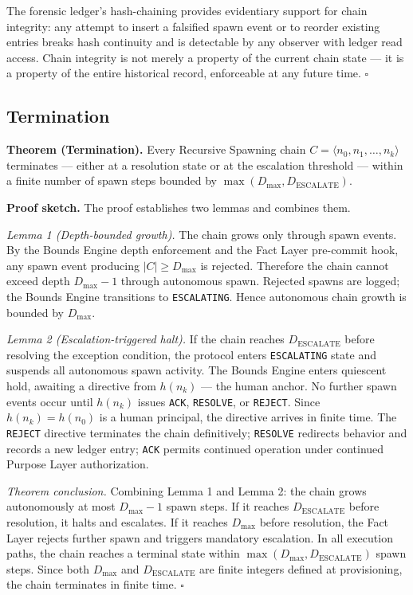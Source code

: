 The forensic ledger's hash-chaining provides evidentiary support for chain integrity: any attempt to insert a falsified spawn event or to reorder existing entries breaks hash continuity and is detectable by any observer with ledger read access. Chain integrity is not merely a property of the current chain state --- it is a property of the entire historical record, enforceable at any future time. $\square$

\subsection{Termination}
\label{sec:rs-termination}

\medskip
\noindent\textbf{Theorem (Termination).} Every Recursive Spawning chain $C = \langle n_0, n_1, \ldots, n_k \rangle$ terminates --- either at a resolution state or at the escalation threshold --- within a finite number of spawn steps bounded by $\max(D_{\mathrm{max}}, D_{\mathrm{ESCALATE}})$.

\medskip
\noindent\textbf{Proof sketch.} The proof establishes two lemmas and combines them.

\medskip
\textit{Lemma 1 (Depth-bounded growth).} The chain grows only through spawn events. By the Bounds Engine depth enforcement and the Fact Layer pre-commit hook, any spawn event producing $|C| \geq D_{\mathrm{max}}$ is rejected. Therefore the chain cannot exceed depth $D_{\mathrm{max}} - 1$ through autonomous spawn. Rejected spawns are logged; the Bounds Engine transitions to \texttt{ESCALATING}. Hence autonomous chain growth is bounded by $D_{\mathrm{max}}$.

\medskip
\textit{Lemma 2 (Escalation-triggered halt).} If the chain reaches $D_{\mathrm{ESCALATE}}$ before resolving the exception condition, the protocol enters \texttt{ESCALATING} state and suspends all autonomous spawn activity. The Bounds Engine enters quiescent hold, awaiting a directive from $h(n_k)$ --- the human anchor. No further spawn events occur until $h(n_k)$ issues \texttt{ACK}, \texttt{RESOLVE}, or \texttt{REJECT}. Since $h(n_k) = h(n_0)$ is a human principal, the directive arrives in finite time. The \texttt{REJECT} directive terminates the chain definitively; \texttt{RESOLVE} redirects behavior and records a new ledger entry; \texttt{ACK} permits continued operation under continued Purpose Layer authorization.

\medskip
\textit{Theorem conclusion.} Combining Lemma 1 and Lemma 2: the chain grows autonomously at most $D_{\mathrm{max}} - 1$ spawn steps. If it reaches $D_{\mathrm{ESCALATE}}$ before resolution, it halts and escalates. If it reaches $D_{\mathrm{max}}$ before resolution, the Fact Layer rejects further spawn and triggers mandatory escalation. In all execution paths, the chain reaches a terminal state within $\max(D_{\mathrm{max}}, D_{\mathrm{ESCALATE}})$ spawn steps. Since both $D_{\mathrm{max}}$ and $D_{\mathrm{ESCALATE}}$ are finite integers defined at provisioning, the chain terminates in finite time. $\square$

